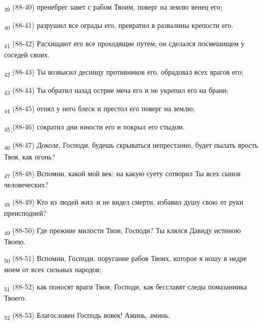 \begin{tcolorbox}
\textsubscript{39} (88-40) пренебрег завет с рабом Твоим, поверг на землю венец его;
\end{tcolorbox}
\begin{tcolorbox}
\textsubscript{40} (88-41) разрушил все ограды его, превратил в развалины крепости его.
\end{tcolorbox}
\begin{tcolorbox}
\textsubscript{41} (88-42) Расхищают его все проходящие путем; он сделался посмешищем у соседей своих.
\end{tcolorbox}
\begin{tcolorbox}
\textsubscript{42} (88-43) Ты возвысил десницу противников его, обрадовал всех врагов его;
\end{tcolorbox}
\begin{tcolorbox}
\textsubscript{43} (88-44) Ты обратил назад острие меча его и не укрепил его на брани;
\end{tcolorbox}
\begin{tcolorbox}
\textsubscript{44} (88-45) отнял у него блеск и престол его поверг на землю;
\end{tcolorbox}
\begin{tcolorbox}
\textsubscript{45} (88-46) сократил дни юности его и покрыл его стыдом.
\end{tcolorbox}
\begin{tcolorbox}
\textsubscript{46} (88-47) Доколе, Господи, будешь скрываться непрестанно, будет пылать ярость Твоя, как огонь?
\end{tcolorbox}
\begin{tcolorbox}
\textsubscript{47} (88-48) Вспомни, какой мой век: на какую суету сотворил Ты всех сынов человеческих?
\end{tcolorbox}
\begin{tcolorbox}
\textsubscript{48} (88-49) Кто из людей жил--и не видел смерти, избавил душу свою от руки преисподней?
\end{tcolorbox}
\begin{tcolorbox}
\textsubscript{49} (88-50) Где прежние милости Твои, Господи? Ты клялся Давиду истиною Твоею.
\end{tcolorbox}
\begin{tcolorbox}
\textsubscript{50} (88-51) Вспомни, Господи, поругание рабов Твоих, которое я ношу в недре моем от всех сильных народов;
\end{tcolorbox}
\begin{tcolorbox}
\textsubscript{51} (88-52) как поносят враги Твои, Господи, как бесславят следы помазанника Твоего.
\end{tcolorbox}
\begin{tcolorbox}
\textsubscript{52} (88-53) Благословен Господь вовек! Аминь, аминь.
\end{tcolorbox}
